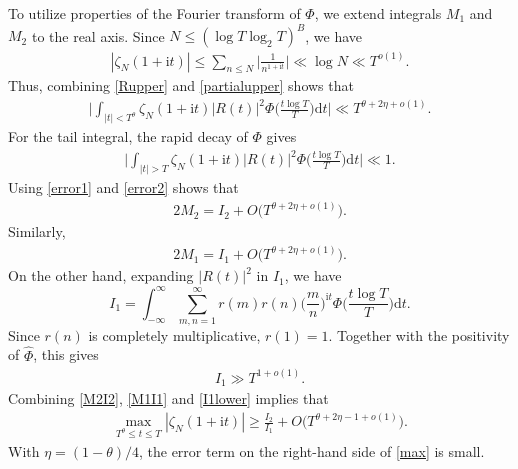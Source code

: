 \documentclass[12pt,reqno]{amsart}
\theoremstyle{definition}
\numberwithin{equation}{section}
\newcommand{\bg}{\big}
\newcommand{\bgg}{\bigg}
\newcommand{\Bg}{\Big}
\newcommand{\lo}{\log_2}
\newcommand{\ph}{\Phi}
\newcommand{\mit}{\mathrm{i}t}
\newcommand{\mdt}{\mathrm{d}t}
\newcommand{\whp}{\widehat{\Phi}}
\begin{document}
To utilize properties of the Fourier transform of \(\ph\), we extend integrals \(M_1\) and \(M_2\) to the real axis. Since \(N \le (\log T \lo T)^B\), we have
\begin{align}
    \label{partialupper}
    |\zeta_N(1+\mit)| \le \sum_{n \le N}\Bg|\frac{1}{n^{1+\mit}}\Bg| \ll \log N \ll T^{o(1)}.
\end{align}
Thus, combining \eqref{Rupper} and \eqref{partialupper} shows that
\begin{align}
    \label{error1}
    \bgg|\int_{|t| < T^\theta} \zeta_N(1+\mit)|R(t)|^2 \ph\Bg(\frac{t\log T}{T} \Bg) \mdt\bgg| \ll T^{\theta+2\eta+o(1)}.
\end{align}
For the tail integral, the rapid decay of \(\ph\) gives 
\begin{align}
    \label{error2}
    \bgg|\int_{|t| > T} \zeta_N(1+\mit)|R(t)|^2 \ph\Bg(\frac{t\log T}{T} \Bg) \mdt\bgg| \ll 1.
\end{align}
Using \eqref{error1} and \eqref{error2} shows that 
\begin{align}
    \label{M2I2}
    2M_2 = I_2 + O\bg(T^{\theta+2\eta+o(1)}\bg).
\end{align}
Similarly, 
\begin{align}
    \label{M1I1}
    2M_1 = I_1 + O\bg(T^{\theta+2\eta+o(1)}\bg).
\end{align}
On the other hand, expanding \(|R(t)|^2\) in \(I_1\), we have
\[
I_1 = \int_{-\infty}^\infty \sum_{m,n=1}^\infty r(m)r(n) \Bg(\frac{m}{n}\Bg)^{\mit}\ph\Bg(\frac{t\log T}{T} \Bg) \mdt.
\]
Since \(r(n)\) is completely multiplicative, \(r(1)=1\). Together with the positivity of \(\whp\), this gives
\begin{align}
    \label{I1lower}
    I_1 \gg T^{1+o(1)}.
\end{align}
Combining \eqref{M2I2}, \eqref{M1I1} and \eqref{I1lower} implies that
\begin{align}
    \label{max}
    \max_{T^\theta \le t \le T}|\zeta_N(1+\mit)| \ge \frac{I_2}{I_1} + O\bg(T^{\theta+2\eta-1+o(1)}\bg).
\end{align}
With \(\eta = (1-\theta)/4\), the error term on the right-hand side of \eqref{max} is small.
\end{document}
